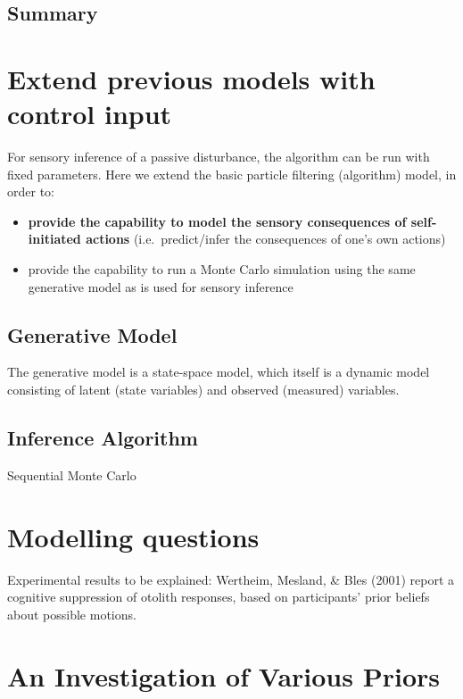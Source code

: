 \documentclass[english,floatsintext,man]{apa6}
\providecommand{\tightlist}{%
  \setlength{\itemsep}{0pt}\setlength{\parskip}{0pt}}
\theoremstyle{definition}
\theoremstyle{definition}
\theoremstyle{remark}
\begin{document}
\subsection{Summary}\label{summary}

\section{Extend previous models with control
input}\label{extend-previous-models-with-control-input}

For sensory inference of a passive disturbance, the algorithm can be run
with fixed parameters. Here we extend the basic particle filtering
(algorithm) model, in order to:

\begin{itemize}
\tightlist
\item
  \textbf{provide the capability to model the sensory consequences of
  self-initiated actions} (i.e.~predict/infer the consequences of one's
  own actions)
\item
  provide the capability to run a Monte Carlo simulation using the same
  generative model as is used for sensory inference
\end{itemize}

\subsection{Generative Model}\label{generative-model}

The generative model is a state-space model, which itself is a dynamic
model consisting of latent (state variables) and observed (measured)
variables.

\subsection{Inference Algorithm}\label{inference-algorithm}

Sequential Monte Carlo

\section{Modelling questions}\label{modelling-questions}

Experimental results to be explained: Wertheim, Mesland, \& Bles (2001)
report a cognitive suppression of otolith responses, based on
participants' prior beliefs about possible motions.

\section{An Investigation of Various
Priors}\label{an-investigation-of-various-priors}
\end{document}
